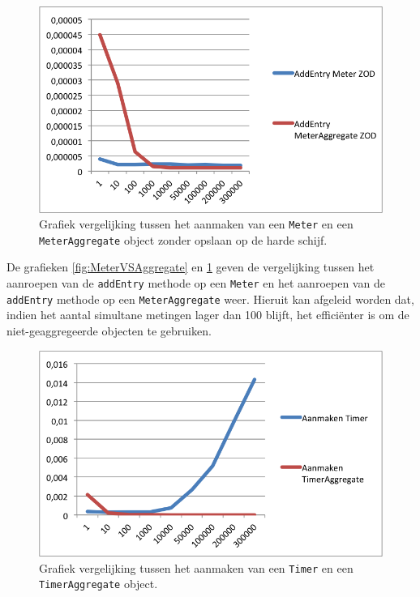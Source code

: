 \begin{figure}[h]
  \centering
  \includegraphics[scale=1.0]{Afbeeldingen/Evaluatie/MeterVSAggregateZOD}
  \caption{Grafiek vergelijking tussen het aanmaken van een \texttt{Meter} en een \texttt{MeterAggregate} object zonder opslaan op de harde schijf.}
  \label{fig:MeterVSAggregateZOD}
\end{figure}

De grafieken \ref{fig:MeterVSAggregate} en \ref{fig:MeterVSAggregateZOD} geven de vergelijking tussen het aanroepen van de \texttt{addEntry} methode op een \texttt{Meter} en het aanroepen van de \texttt{addEntry} methode op een \texttt{MeterAggregate} weer. Hieruit kan afgeleid worden dat, indien het aantal simultane metingen lager dan 100 blijft, het effici\"enter is om de niet-geaggregeerde objecten te gebruiken. \\

\begin{figure}[h]
  \centering
  \includegraphics[scale=1.0]{Afbeeldingen/Evaluatie/TimerVSAggregate}
  \caption{Grafiek vergelijking tussen het aanmaken van een \texttt{Timer} en een \texttt{TimerAggregate} object.}
  \label{fig:TimerVSAggregate}
\end{figure}

